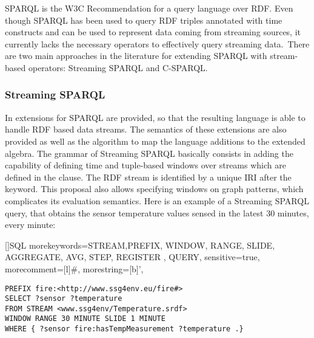 SPARQL \cite{Prudhommeaux_2008} is the W3C Recommendation for a query language over RDF. Even though  SPARQL has been used to query RDF triples annotated with time constructs \cite{Barbieri_2010,Bolles_08} and can be used to represent data coming from streaming sources, it currently lacks the necessary operators to effectively query streaming data.\
There are two main approaches in the literature for extending SPARQL with stream-based operators: Streaming SPARQL and C-SPARQL.
\subsubsection{Streaming SPARQL}
In \cite{Bolles_08} extensions for SPARQL are provided, so that the resulting language is able to handle RDF based data streams. The semantics of these extensions are also provided as well as the algorithm to map the language additions to the extended algebra. The grammar of Streaming SPARQL basically consists in adding the capability of defining time and tuple-based windows over streams which are defined in the  clause. The RDF stream is identified by a unique IRI after the  keyword. %
This proposal also allows specifying windows on graph patterns, which complicates its evaluation semantics. %
Here is an example of a Streaming SPARQL query, that obtains the sensor temperature values sensed in the latest 30 minutes, every minute:

[]{SQL}{
morekeywords={STREAM,PREFIX, WINDOW, RANGE, SLIDE, AGGREGATE, AVG, STEP, REGISTER , QUERY},
sensitive=true,%
morecomment=[l]\#,%
morestring=[b]',%
}




\begin{lstlisting}[style=SPARQLSTRStyle,language=SPARQLSTR,frame=none]
PREFIX fire:<http://www.ssg4env.eu/fire#>
SELECT ?sensor ?temperature
FROM STREAM <www.ssg4env/Temperature.srdf>
WINDOW RANGE 30 MINUTE SLIDE 1 MINUTE
WHERE { ?sensor fire:hasTempMeasurement ?temperature .}
\end{lstlisting}


